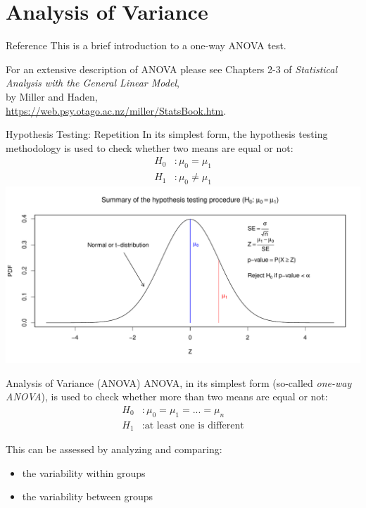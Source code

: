 \section{Analysis of Variance}
\begin{frame}{Reference}
    This is a brief introduction to a one-way ANOVA test.
    
    For an extensive description of ANOVA please see Chapters 2-3 of \textit{Statistical Analysis with the General Linear Model},\\
    by Miller and Haden,\\
    \url{https://web.psy.otago.ac.nz/miller/StatsBook.htm}.
\end{frame}

\begin{frame}{Hypothesis Testing: Repetition}
    In its simplest form, the hypothesis testing methodology is used to check
    whether two means are equal or not:
    \begin{align*}
    H_0&: \mu_0 = \mu_1 \\
    H_1&: \mu_0 \ne \mu_1
    \end{align*}
    \includegraphics[width=\linewidth]{R/plots/hypothesis_test_summary}
\end{frame}

\begin{frame}{Analysis of Variance (ANOVA)}
    ANOVA, in its simplest form (so-called \emph{one-way ANOVA}), is used to check whether more than two means are equal or not:
    \begin{align*}
        H_0&: \mu_0 = \mu_1 = ... = \mu_n \\
        H_1&: \text{at least one is different}
        \end{align*}

    This can be assessed by analyzing and comparing:
    \begin{itemize}
        \item the variability within groups
        \item the variability between groups
    \end{itemize}
\end{frame}

